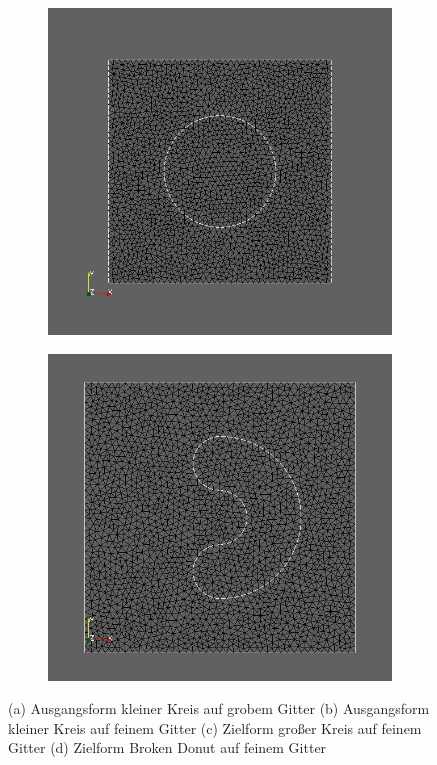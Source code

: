 \begin{figure}
\begin{subfigure}{0.5\textwidth}
	\caption{}	
	\end{subfigure}
	\begin{subfigure}{0.5\textwidth}
	\centering
	\includegraphics[scale=0.25]{pic_bigcircle_fine.jpg}
	\caption{}	
	\end{subfigure}
	\begin{subfigure}{0.5\textwidth}
	\centering
	\includegraphics[scale=0.25]{pic_brokendonut_fine.jpg}
	\caption{}	
	\end{subfigure}
\caption{(a) Ausgangsform kleiner Kreis auf grobem Gitter (b) Ausgangsform kleiner Kreis auf feinem Gitter (c) Zielform großer Kreis auf feinem Gitter (d) Zielform Broken Donut auf feinem Gitter}
\label{Meshes}
\end{figure}

